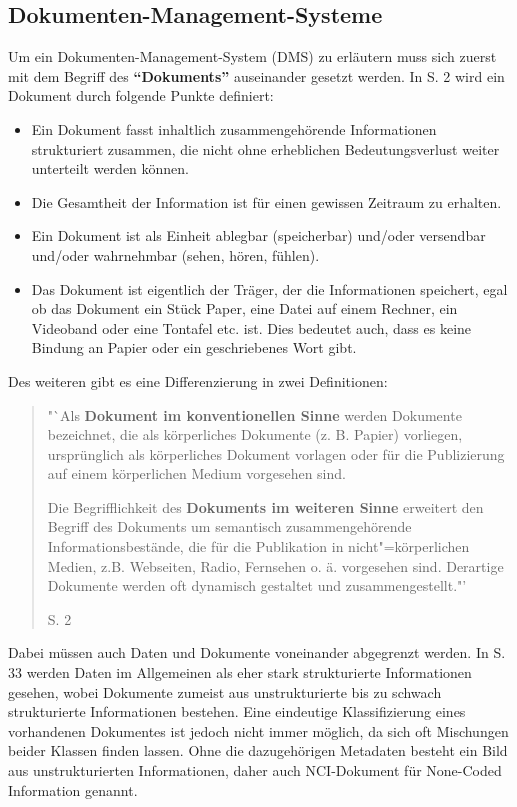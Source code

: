 \subsection{Dokumenten-Management-Systeme}

Um ein Dokumenten-Management-System (\gls{DMS})  zu erläutern muss sich zuerst mit dem Begriff des \textbf{"`Dokuments"'} auseinander gesetzt werden.
In \cite{DMS08} S. 2 wird ein Dokument durch folgende Punkte definiert:

\begin{itemize}
\item Ein Dokument fasst inhaltlich zusammengehörende Informationen strukturiert zusammen, die nicht ohne erheblichen Bedeutungsverlust weiter unterteilt werden können. 
\item Die Gesamtheit der Information ist für einen gewissen Zeitraum zu erhalten.
\item Ein Dokument ist als Einheit ablegbar (speicherbar) und/oder versendbar und/oder wahrnehmbar (sehen, hören, fühlen).
\item Das Dokument ist eigentlich der Träger, der die Informationen speichert, egal ob das Dokument ein Stück Paper, eine Datei auf einem Rechner, ein Videoband oder eine Tontafel etc. ist. Dies bedeutet auch, dass es keine Bindung an Papier oder ein geschriebenes Wort gibt.
\end{itemize}

Des weiteren gibt es eine Differenzierung in zwei Definitionen:

\begin{quote}"`Als \textbf{Dokument im konventionellen Sinne} werden Dokumente bezeichnet, die als körperliches Dokumente (z. B. Papier) vorliegen, ursprünglich als körperliches Dokument vorlagen oder für die Publizierung auf einem körperlichen Medium vorgesehen sind.

Die Begrifflichkeit des \textbf{Dokuments im weiteren Sinne} erweitert den Begriff des Dokuments um semantisch zusammengehörende Informationsbestände, die für die Publikation in nicht"=körperlichen Medien, z.B. Webseiten, Radio, Fernsehen o. ä. vorgesehen sind. Derartige Dokumente werden oft dynamisch gestaltet und zusammengestellt."' \begin{flushright}\cite{DMS08} S. 2\end{flushright}\end{quote}

Dabei müssen auch Daten und Dokumente voneinander abgegrenzt werden.
In \cite{DMS08} S. 33 werden Daten im Allgemeinen als eher stark strukturierte Informationen gesehen, wobei Dokumente zumeist aus unstrukturierte bis zu schwach strukturierte Informationen bestehen.
Eine eindeutige Klassifizierung eines vorhandenen Dokumentes ist jedoch nicht immer möglich, da sich oft Mischungen beider Klassen finden lassen.
Ohne die dazugehörigen Metadaten besteht ein Bild aus unstrukturierten Informationen, daher auch \gls{NCI}-Dokument für None-Coded Information genannt.

